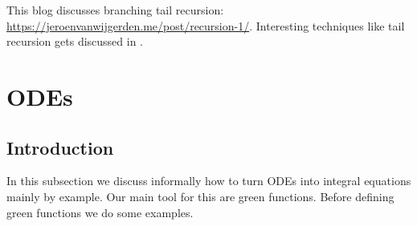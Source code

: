 \documentclass[a4paper,12pt]{article}
\begin{document}

%


\begin{related}
    This blog discusses branching tail recursion:
    \url{https://jeroenvanwijgerden.me/post/recursion-1/}.
    Interesting techniques  like tail recursion  gets discussed in \cite{vicini_path_2021}.
\end{related}


\section{ODEs}

%
%


\subsection{Introduction}
In this subsection we discuss informally how to turn ODEs into integral equations mainly
by example.
Our main tool for this are green functions. Before defining green functions
we do some examples.  \\
\end{document}
